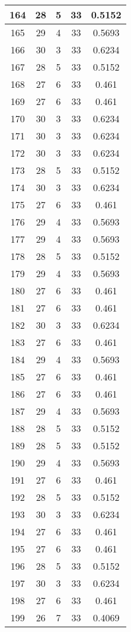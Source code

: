 \documentclass[letterpaper, 12pt]{article}
\begin{document}
\begin{longtable}{|c|c|c|c|c|}
\hline
164 & 28 & 5 & 33 & 0.5152 \\
\hline
165 & 29 & 4 & 33 & 0.5693 \\
\hline
166 & 30 & 3 & 33 & 0.6234 \\
\hline
167 & 28 & 5 & 33 & 0.5152 \\
\hline
168 & 27 & 6 & 33 & 0.461 \\
\hline
169 & 27 & 6 & 33 & 0.461 \\
\hline
170 & 30 & 3 & 33 & 0.6234 \\
\hline
171 & 30 & 3 & 33 & 0.6234 \\
\hline
172 & 30 & 3 & 33 & 0.6234 \\
\hline
173 & 28 & 5 & 33 & 0.5152 \\
\hline
174 & 30 & 3 & 33 & 0.6234 \\
\hline
175 & 27 & 6 & 33 & 0.461 \\
\hline
176 & 29 & 4 & 33 & 0.5693 \\
\hline
177 & 29 & 4 & 33 & 0.5693 \\
\hline
178 & 28 & 5 & 33 & 0.5152 \\
\hline
179 & 29 & 4 & 33 & 0.5693 \\
\hline
180 & 27 & 6 & 33 & 0.461 \\
\hline
181 & 27 & 6 & 33 & 0.461 \\
\hline
182 & 30 & 3 & 33 & 0.6234 \\
\hline
183 & 27 & 6 & 33 & 0.461 \\
\hline
184 & 29 & 4 & 33 & 0.5693 \\
\hline
185 & 27 & 6 & 33 & 0.461 \\
\hline
186 & 27 & 6 & 33 & 0.461 \\
\hline
187 & 29 & 4 & 33 & 0.5693 \\
\hline
188 & 28 & 5 & 33 & 0.5152 \\
\hline
189 & 28 & 5 & 33 & 0.5152 \\
\hline
190 & 29 & 4 & 33 & 0.5693 \\
\hline
191 & 27 & 6 & 33 & 0.461 \\
\hline
192 & 28 & 5 & 33 & 0.5152 \\
\hline
193 & 30 & 3 & 33 & 0.6234 \\
\hline
194 & 27 & 6 & 33 & 0.461 \\
\hline
195 & 27 & 6 & 33 & 0.461 \\
\hline
196 & 28 & 5 & 33 & 0.5152 \\
\hline
197 & 30 & 3 & 33 & 0.6234 \\
\hline
198 & 27 & 6 & 33 & 0.461 \\
\hline
199 & 26 & 7 & 33 & 0.4069 \\
\hline
\end{longtable}
\end{document}
